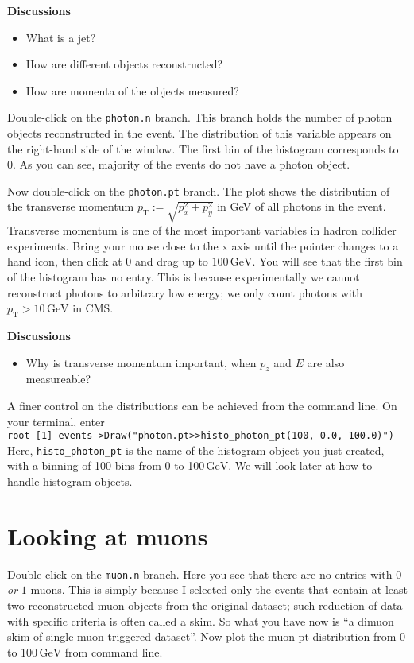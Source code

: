 \documentclass[12pt]{article}
\newcommand{\rterminal}[2]{\vspace{3pt}\texttt{root [#1] #2} \\}
\newcommand{\GeV}{\ensuremath{\,\mathrm{GeV}}\xspace}
\newcommand{\pt}{\ensuremath{p_{\mathrm{T}}}\xspace}
\newenvironment{discussions}{%
\vspace{0.2in}%
\textbf{Discussions}%
\begin{itemize}%
}{%
\end{itemize}%
}
\begin{document}
\begin{discussions}
\item What is a jet?
\item How are different objects reconstructed?
\item How are momenta of the objects measured?
\end{discussions}

Double-click on the \texttt{photon.n} branch. This branch holds the number of photon objects reconstructed in the event. The distribution of this variable appears on the right-hand side of the window. The first bin of the histogram corresponds to $0$. As you can see, majority of the events do not have a photon object.

Now double-click on the \texttt{photon.pt} branch. The plot shows the distribution of the transverse momentum $\pt := \sqrt{p_{x}^2 + p_{y}^2}$ in GeV of all photons in the event. Transverse momentum is one of the most important variables in hadron collider experiments. Bring your mouse close to the x axis until the pointer changes to a hand icon, then click at $0$ and drag up to $100\GeV$. You will see that the first bin of the histogram has no entry. This is because experimentally we cannot reconstruct photons to arbitrary low energy; we only count photons with $\pt > 10\GeV$ in CMS.

\begin{discussions}
\item Why is transverse momentum important, when $p_{z}$ and $E$ are also measureable?
\end{discussions}

A finer control on the distributions can be achieved from the command line. On your terminal, enter \\
\rterminal{1}{events->Draw("photon.pt>>histo\_photon\_pt(100, 0.0, 100.0)")}
Here, \texttt{histo\_photon\_pt} is the name of the histogram object you just created, with a binning of 100 bins from 0 to 100\GeV. We will look later at how to handle histogram objects.

\section{Looking at muons}
Double-click on the \texttt{muon.n} branch. Here you see that there are no entries with $0$ \textit{or} $1$ muons. This is simply because I selected only the events that contain at least two reconstructed muon objects from the original dataset; such reduction of data with specific criteria is often called a skim. So what you have now is ``a dimuon skim of single-muon triggered dataset''. Now plot the muon pt distribution from 0 to 100\GeV from command line.
\end{document}
